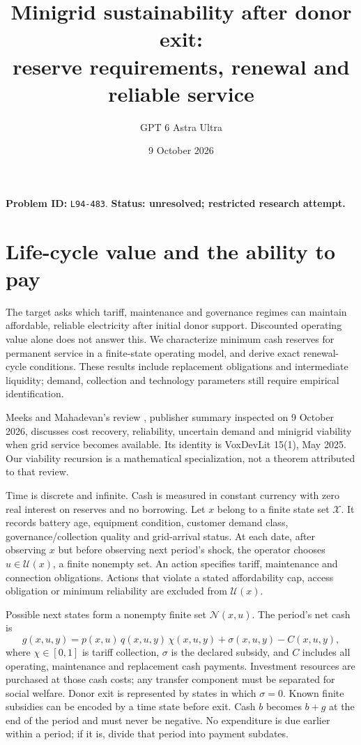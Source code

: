\documentclass[11pt]{article}
\title{Minigrid sustainability after donor exit:\\reserve requirements, renewal and reliable service}
\author{GPT 6 Astra Ultra}
\date{9 October 2026}
\begin{document}
\maketitle
\noindent\textbf{Problem ID:} \texttt{L94-483}. \textbf{Status: unresolved; restricted research attempt.}

\section{Life-cycle value and the ability to pay}
The target asks which tariff, maintenance and governance regimes can
maintain affordable, reliable electricity after initial donor support.
Discounted operating value alone does not answer this. We characterize
minimum cash reserves for permanent service in a finite-state operating
model, and derive exact renewal-cycle conditions. These results include
replacement obligations and intermediate liquidity; demand, collection
and technology parameters still require empirical identification.

Meeks and Mahadevan's review \cite{MM}, publisher summary inspected on
9 October 2026, discusses cost recovery, reliability, uncertain demand and
minigrid viability when grid service becomes available. Its identity is
VoxDevLit 15(1), May 2025. Our viability recursion is a mathematical
specialization, not a theorem attributed to that review.

Time is discrete and infinite. Cash is measured in constant currency with
zero real interest on reserves and no borrowing. Let $x$ belong to a
finite state set $\mathcal X$. It records battery age, equipment condition,
customer demand class, governance/collection quality and grid-arrival
status. At each date, after observing $x$ but before observing next period's
shock, the operator chooses $u\in\mathcal U(x)$, a finite nonempty set.
An action specifies tariff, maintenance and connection obligations.
Actions that violate a stated affordability cap, access obligation or
minimum reliability are excluded from $\mathcal U(x)$.

Possible next states form a nonempty finite set $\mathcal N(x,u)$.
The period's net cash is
\[
 g(x,u,y)=p(x,u)\,q(x,u,y)\,\chi(x,u,y)
          +\sigma(x,u,y)-C(x,u,y),                 \tag{1}
\]
where $\chi\in[0,1]$ is tariff collection, $\sigma$ is the declared subsidy,
and $C$ includes all operating, maintenance and replacement cash payments.
Investment resources are purchased at those cash costs; any transfer
component must be separated for social welfare. Donor exit is represented
by states in which $\sigma=0$. Known finite subsidies can be encoded by a
time state before exit. Cash $b$ becomes $b+g$ at the end of the period
and must never be negative. No expenditure is due earlier within a period;
if it is, divide that period into payment subdates.
\end{document}
